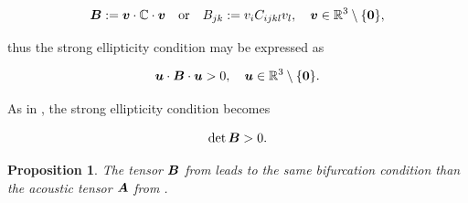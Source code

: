 \documentclass[12pt]{article}
\newtheorem{proposition}{Proposition}
\numberwithin{equation}{section}
\begin{document}
\begin{equation} \label{eq:Cartesian-acoustic-tensor}
  {\boldsymbol{B}} := {\boldsymbol{v}} \cdot \mathbb{C} \cdot {\boldsymbol{v}}
  \quad \text{or} \quad
  B_{jk} := v_i C_{ijkl} v_l,
  \quad
  {\boldsymbol{v}} \in \mathbb{R}^3 \setminus \{\mathbf{0}\},
\end{equation}

thus the strong ellipticity condition may be expressed as

\begin{equation} \label{eq:Cartesian-acoustic-ellipticity}
  {\boldsymbol{u}} \cdot {\boldsymbol{B}} \cdot {\boldsymbol{u}} > 0,
  \quad
  {\boldsymbol{u}} \in \mathbb{R}^3 \setminus \{\mathbf{0}\}.
\end{equation}

As in , the strong ellipticity
condition becomes

\begin{equation} \label{Cartesian-acoustic-determinant}
  \det {\boldsymbol{B}} > 0.
\end{equation}

\begin{proposition}
  The tensor ${\boldsymbol{B}}$ from  leads to
  the same bifurcation condition than the acoustic tensor ${\boldsymbol{A}}$ from
  .
\end{proposition}
\end{document}
